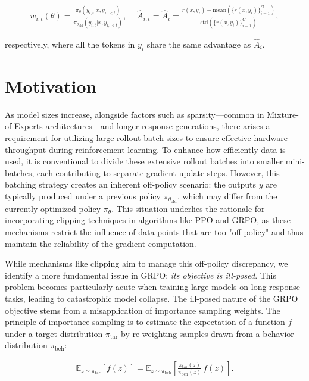 \begin{align}
    w_{i,t}(\theta)=\frac{ \pi_{\theta} (y_{i,t} | x, y_{i,<t}) }{ \pi_{\theta_\text{old}} (y_{i,t} | x,y_{i,<t})},\quad\ 
    \widehat{A}_{i,t} = \widehat{A}_{i} = \frac{r(x, y_i) - \mathrm{mean} \left( \{ r(x, y_i) \}_{i=1}^G \right) }{ \mathrm{std} \left( \{ r(x, y_i) \}_{i=1}^G \right) },
\end{align}

respectively, where all the tokens in $y_i$ share the same advantage as $\widehat{A}_{i}$.

\section{Motivation}
\label{sec:motivation}

As model sizes increase, alongside factors such as sparsity—common in Mixture-of-Experts architectures—and longer response generations, there arises a requirement for utilizing large rollout batch sizes to ensure effective hardware throughput during reinforcement learning. To enhance how efficiently data is used, it is conventional to divide these extensive rollout batches into smaller mini-batches, each contributing to separate gradient update steps. However, this batching strategy creates an inherent off-policy scenario: the outputs $y$ are typically produced under a previous policy $\pi_{\theta_\text{old}}$, which may differ from the currently optimized policy $\pi_\theta$. This situation underlies the rationale for incorporating clipping techniques in algorithms like PPO and GRPO, as these mechanisms restrict the influence of data points that are too "off-policy" and thus maintain the reliability of the gradient computation.

While mechanisms like clipping aim to manage this off-policy discrepancy, we identify a more fundamental issue in GRPO: \textit{its objective is ill-posed}. This problem becomes particularly acute when training large models on long-response tasks, leading to catastrophic model collapse. The ill-posed nature of the GRPO objective stems from a misapplication of importance sampling weights. The principle of importance sampling is to estimate the expectation of a function $f$ under a target distribution $\pi_\text{tar}$ by re-weighting samples drawn from a behavior distribution $\pi_\text{beh}$:

\begin{align}
\mathbb{E}_{z \sim \pi_\text{tar}} \left[ f(z) \right] = \mathbb{E}_{z \sim \pi_\text{beh}} \left[ \frac{ \pi_\text{tar} (z) }{ \pi_\text{beh} (z)} \, f(z) \right].
\end{align}

